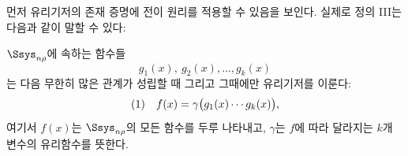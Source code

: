 
먼저 유리기저의 존재 증명에 전이 원리를 적용할 수 있음을 보인다. 실제로 정의 III는 다음과 같이 말할 수 있다:

$\Ssys_{n\rho}$에 속하는 함수들
\[
g_1(x),\ g_2(x),\ldots,g_k(x)
\]
는 다음 무한히 많은 관계가 성립할 때 그리고 그때에만 유리기저를 이룬다:
\[
\begin{array}{@{}l@{\quad}c@{}}
(1)& f(x)=\gamma\bigl(g_1(x)\cdots g_k(x)\bigr),
\end{array}
\]
여기서 $f(x)$는 $\Ssys_{n\rho}$의 모든 함수를 두루 나타내고, $\gamma$는 $f$에 따라 달라지는 $k$개 변수의 유리함수를 뜻한다.
